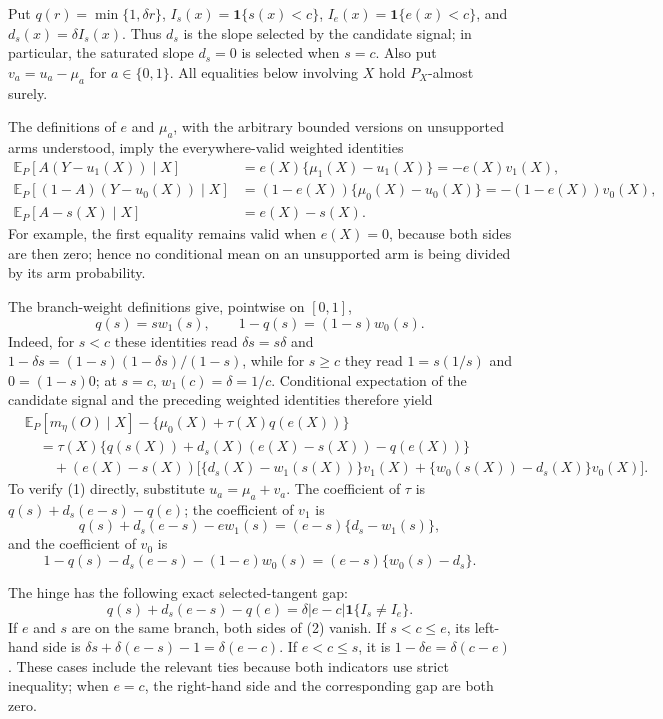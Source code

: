 Put \(q(r)=\min\{1,\delta r\}\), \(I_s(x)=\mathbf 1\{s(x)<c\}\), \(I_e(x)=\mathbf 1\{e(x)<c\}\), and \(d_s(x)=\delta I_s(x)\).  Thus \(d_s\) is the slope selected by the candidate signal; in particular, the saturated slope \(d_s=0\) is selected when \(s=c\).  Also put \(v_a=u_a-\mu_a\) for \(a\in\{0,1\}\).  All equalities below involving \(X\) hold \(P_X\)-almost surely.

The definitions of \(e\) and \(\mu_a\), with the arbitrary bounded versions on unsupported arms understood, imply the everywhere-valid weighted identities
\[
\begin{aligned}
 \mathbb E_P[A(Y-u_1(X))\mid X]
 &=e(X)\{\mu_1(X)-u_1(X)\}=-e(X)v_1(X),\\
 \mathbb E_P[(1-A)(Y-u_0(X))\mid X]
 &=(1-e(X))\{\mu_0(X)-u_0(X)\}=-(1-e(X))v_0(X),\\
 \mathbb E_P[A-s(X)\mid X]&=e(X)-s(X).
\end{aligned}
\]
For example, the first equality remains valid when \(e(X)=0\), because both sides are then zero; hence no conditional mean on an unsupported arm is being divided by its arm probability.

The branch-weight definitions give, pointwise on \([0,1]\),
\[
 q(s)=s w_1(s),\qquad 1-q(s)=(1-s)w_0(s).
\]
Indeed, for \(s<c\) these identities read \(\delta s=s\delta\) and \(1-\delta s=(1-s)(1-\delta s)/(1-s)\), while for \(s\ge c\) they read \(1=s(1/s)\) and \(0=(1-s)0\); at \(s=c\), \(w_1(c)=\delta=1/c\).  Conditional expectation of the candidate signal and the preceding weighted identities therefore yield
\[
\begin{aligned}
 &\mathbb E_P[m_\eta(O)\mid X]-\{\mu_0(X)+\tau(X)q(e(X))\}\\
 &\quad=\tau(X)\{q(s(X))+d_s(X)(e(X)-s(X))-q(e(X))\}\\
 &\qquad +(e(X)-s(X))
 \bigl[\{d_s(X)-w_1(s(X))\}v_1(X)
       +\{w_0(s(X))-d_s(X)\}v_0(X)\bigr].
\end{aligned}
\tag{1}
\]
To verify (1) directly, substitute \(u_a=\mu_a+v_a\).  The coefficient of \(\tau\) is \(q(s)+d_s(e-s)-q(e)\); the coefficient of \(v_1\) is
\[
 q(s)+d_s(e-s)-e w_1(s)=(e-s)\{d_s-w_1(s)\},
\]
and the coefficient of \(v_0\) is
\[
 1-q(s)-d_s(e-s)-(1-e)w_0(s)=(e-s)\{w_0(s)-d_s\}.
\]

The hinge has the following exact selected-tangent gap:
\[
 q(s)+d_s(e-s)-q(e)
 =\delta |e-c|\mathbf 1\{I_s\ne I_e\}.
\tag{2}
\]
If \(e\) and \(s\) are on the same branch, both sides of (2) vanish.  If \(s<c\le e\), its left-hand side is \(\delta s+\delta(e-s)-1=\delta(e-c)\).  If \(e<c\le s\), it is \(1-\delta e=\delta(c-e)\).  These cases include the relevant ties because both indicators use strict inequality; when \(e=c\), the right-hand side and the corresponding gap are both zero.

